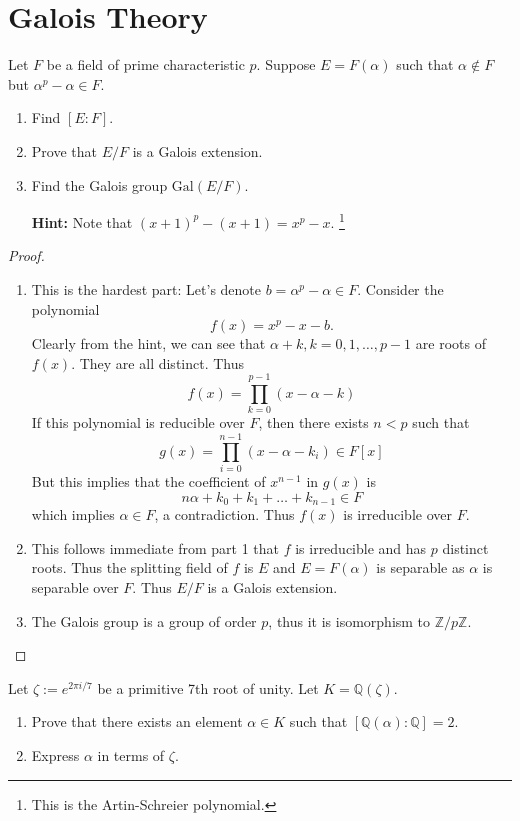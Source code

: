 \documentclass[11pt,letterpaper]{article}
\DeclareMathOperator{\1}{\mathbbm{1}}
\begin{document}
\section{Galois Theory}
\begin{exercise}\label{Galois theory }
  Let $F$ be a field of prime characteristic $p$. Suppose $E = F(\alpha)$ such that
  $\alpha \notin F$ but $\alpha^p -\alpha \in F$.
  \begin{enumerate}
    \item Find $[E:F]$.
    \item Prove that $E/F$ is a Galois extension.
    \item Find the Galois group $\text{Gal}(E/F)$.

          \textbf{Hint:} Note that $(x+1)^p -(x+1)=x^p -x$. \footnote{This is the Artin-Schreier polynomial.}

  \end{enumerate}
\end{exercise}
\begin{proof}
  \hfill \\
  \begin{enumerate}
    \item This is the hardest part: Let's denote $b=\alpha^p - \alpha \in F$. Consider the
          polynomial $$f(x) = x^p - x - b.$$
          Clearly from the hint, we can see that $\alpha+k, k = 0,1,\ldots,p-1$ are roots of $f(x)$. They are all distinct.
          Thus
          \[f(x) = \prod_{k=0}^{p-1}(x-\alpha-k)\]
          If this polynomial is reducible over $F$, then there exists $n < p$ such that
          \[g(x) = \prod_{i=0}^{n-1}(x-\alpha-k_i) \in F[x]\]
          But this implies that the coefficient of $x^{n-1}$ in $g(x)$ is
          \[n\alpha + k_0+k_1+\ldots+k_{n-1} \in F\]
          which implies $\alpha \in F$, a contradiction. Thus $f(x)$ is irreducible over $F$.
    \item This follows immediate from part 1 that $f$ is irreducible and has $p$ distinct roots. Thus the splitting field of $f$ is $E$ and $E=F(\alpha)$
          is separable as $\alpha$ is separable over $F$. Thus $E/F$ is a Galois extension.
    \item The Galois group is a group of order $p$, thus it is isomorphism to $\mathbb{Z}/p\mathbb{Z}$.
  \end{enumerate}
\end{proof}
\begin{exercise}
  Let $\zeta := e^{2\pi i/7}$ be a primitive 7th root of unity. Let $K = \mathbb{Q}(\zeta)$.
  \begin{enumerate}
    \item Prove that there exists an element $\alpha \in K$ such that  $[\mathbb{Q}(\alpha):\mathbb{Q}] = 2$.
    \item Express $\alpha$ in terms of $\zeta$.
  \end{enumerate}
\end{exercise}
\end{document}
